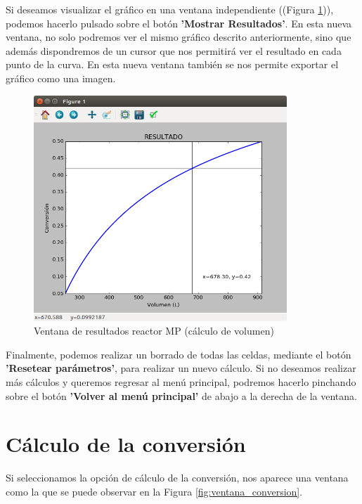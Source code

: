 Si deseamos visualizar el gráfico en una ventana independiente ((Figura \ref{fig:ventana_graficas_volumen})), podemos hacerlo pulsado sobre el botón \textbf{'Mostrar Resultados'}. En esta nueva ventana, no solo podremos ver el mismo gráfico descrito anteriormente, sino que además dispondremos de un cursor que nos permitirá ver el resultado en cada punto de la curva. En esta nueva ventana también se nos permite exportar el gráfico como una imagen.

\begin{figure}[h!]
	\begin{center}
		\includegraphics[width=0.85\textwidth]{./imagenes/reactor_fp/mezcla_perfecta2.png}\caption{Ventana de resultados reactor MP (cálculo de volumen)}\label{fig:ventana_graficas_volumen}
	\end{center}
\end{figure}

Finalmente, podemos realizar un borrado de todas las celdas, mediante el botón \textbf{'Resetear parámetros'}, para realizar un nuevo cálculo. Si no deseamos realizar más cálculos y queremos regresar al menú principal, podremos hacerlo pinchando sobre el botón \textbf{'Volver al menú principal'} de abajo a la derecha de la ventana.


\section{Cálculo de la conversión}
Si seleccionamos la opción de cálculo de la conversión, nos aparece una ventana como la que se puede observar en la Figura \ref{fig:ventana_conversion}.

